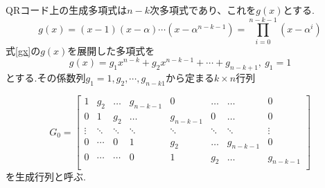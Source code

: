 \documentclass{thesis}
\begin{document}


QRコード上の生成多項式\cite{Ikeda}\cite{Tom}は$n-k$次多項式であり、これを$g(x)$とする.\\

\begin{equation}
 g(x)=(x-1)(x-\alpha)\cdots(x-\alpha^{n-k-1})= \prod_{i=0}^{n-k-1}(x-\alpha^i)
 \label{gx}
\end{equation}
式\ref{gx}の$g(x)$を展開した多項式を
\begin{equation}
 g(x)=g_1x^{n-k}+g_2x^{n-k-1}+\cdots+g_{n-k+1},\ g_1=1
 \label{gx_ten}
\end{equation}
とする.その係数列$g_1=1,g_2,\cdots,g_{n-k1}$から定まる$k\times n$行列

\[
  G_0 = \left[
    \begin{array}{cccccccc}
      1        & g_2      & \ldots  & g_{n-k-1} & 0            & \ldots  & \ldots    & 0 \\
      0        & 1        & g_2      & \ldots     & g_{n-k-1}  & 0        & \ldots    & 0 \\
      \vdots & \ddots & \ddots & \ddots     & \ddots     & \ddots & \ddots   & \vdots \\
      0        & \cdots & 0        & 1            & g_2          & \ldots & g_{n-k-1} &       0       \\
      0        & \cdots & \cdots & 0            & 1            & g_2     & \ldots     & g_{n-k-1}       \\
    \end{array}
  \right]
\]
を生成行列と呼ぶ.
\end{document}
